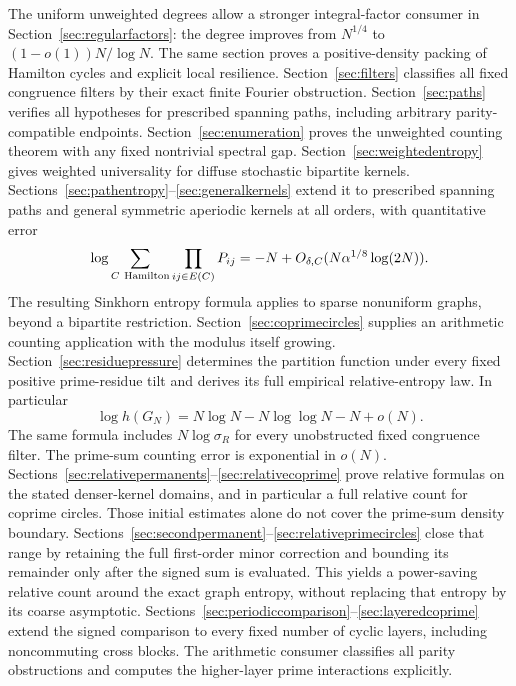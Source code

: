 \documentclass[11pt]{article}
\theoremstyle{remark}
\begin{document}
The uniform unweighted degrees allow a stronger integral-factor
consumer in Section~\ref{sec:regularfactors}: the degree improves
from \(N^{1/4}\) to \((1-o(1))N/\log N\).
The same section proves a positive-density packing of Hamilton
cycles and explicit local resilience.
Section~\ref{sec:filters} classifies all fixed congruence filters
by their exact finite Fourier obstruction.
Section~\ref{sec:paths} verifies all hypotheses for prescribed
spanning paths, including arbitrary parity-compatible endpoints.
Section~\ref{sec:enumeration} proves the unweighted counting
theorem with any fixed nontrivial spectral gap.
Section~\ref{sec:weightedentropy} gives weighted universality
for diffuse stochastic bipartite kernels.
Sections~\ref{sec:pathentropy}--\ref{sec:generalkernels} extend
it to prescribed spanning paths and general symmetric
aperiodic kernels at all orders, with quantitative error
\[
 \log\sum_{C\ {\rm Hamilton}}\prod_{ij\in E(C)}P_{ij}
       =-N+O_{\delta,C}(N\alpha^{1/8}\log(2N)).
\]
The resulting Sinkhorn entropy formula applies to sparse
nonuniform graphs, beyond a bipartite restriction.
Section~\ref{sec:coprimecircles} supplies an arithmetic
counting application with the modulus itself growing.
Section~\ref{sec:residuepressure} determines the partition
function under every fixed positive prime-residue tilt and
derives its full empirical relative-entropy law.
In particular
\[
 \log h(G_N)=N\log N-N\log\log N-N+o(N).
\]
The same formula includes \(N\log\sigma_R\) for every
unobstructed fixed congruence filter.
The prime-sum counting error is exponential in \(o(N)\).
Sections~\ref{sec:relativepermanents}--\ref{sec:relativecoprime}
prove relative formulas on the stated denser-kernel domains,
and in particular a full relative count for coprime circles.
Those initial estimates alone do not cover the prime-sum
density boundary. Sections~\ref{sec:secondpermanent}--\ref{sec:relativeprimecircles}
close that range by retaining the full first-order minor correction
and bounding its remainder only after the signed sum is evaluated.
This yields a power-saving relative count around the exact graph
entropy, without replacing that entropy by its coarse asymptotic.
Sections~\ref{sec:periodiccomparison}--\ref{sec:layeredcoprime}
extend the signed comparison to every fixed number of cyclic
layers, including noncommuting cross blocks.
The arithmetic consumer classifies all parity obstructions and
computes the higher-layer prime interactions explicitly.






















\end{document}
